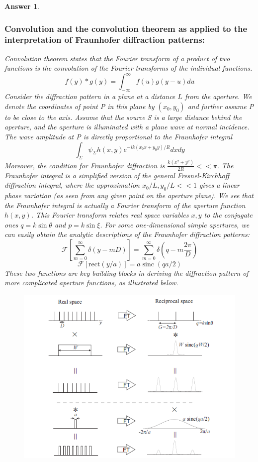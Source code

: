 \documentclass[a4paper]{article}
\DeclareMathOperator{\sinc}{sinc}
\newtheorem{ans}{Answer}[subsection]
\theoremstyle{new}
\begin{document}
\begin{ans}\leavevmode
\subsubsection*{Convolution and the convolution theorem as applied to the interpretation of Fraunhofer diffraction patterns:}
Convolution theorem states that the Fourier transform of a product of two functions is the convolution of the Fourier transforms of the individual functions.
$$f(y)*g(y)=\int_{-\infty}^\infty f(u)g(y-u)du$$
Consider the diffraction pattern in a plane at a distance $L$ from the aperture. We denote the coordinates of point P in this plane by $(x_0,y_0)$ and further assume P to be close to the axis. Assume that the source S is a large distance behind the aperture, and the aperture is illuminated with a plane wave at normal incidence. The wave amplitude at P is directly proportional to the Fraunhofer integral
$$\int_\Sigma\psi_\Sigma h(x,y)e^{-ik(x_0x+y_0y)/R}dxdy$$
Moreover, the condition for Fraunhofer diffraction is $\frac{k(x^2+y^2)}{2R}<<\pi$. The Fraunhofer integral is a simplified version of the general Fresnel-Kirchhoff diffraction integral, where the approximation $x_0/L,y_0/L<<1$ gives a linear phase variation (as seen from any given point on the aperture plane). We see that the Fraunhofer integral is actually a Fourier transform of the aperture function $h(x,y)$. This Fourier transform relates real space variables $x,y$ to the conjugate ones $q=k\sin\theta$ and $p=k\sin\xi$. For some one-dimensional simple apertures, we can easily obtain the analytic descriptions of the Fraunhofer diffraction patterns:
$$\mathcal{F}[\sum_{m=0}^\infty\delta(y-mD)]=\sum_{m=0}^\infty\delta(q-m\frac{2\pi}{D})$$
$$\mathcal{F}[\text{rect}(y/a)]=a\sinc(qa/2)$$
These two functions are key building blocks in deriving the diffraction pattern of more complicated aperture functions, as illustrated below.
\begin{figure}[H]
    \centering
    \includegraphics[scale=0.75]{convolution.PNG}

\end{figure}
\end{ans}
\end{document}
